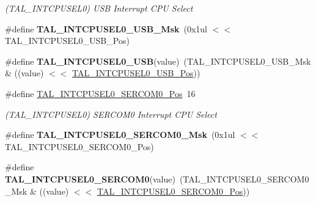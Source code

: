 \begin{DoxyCompactItemize}
\begin{DoxyCompactList}\small\item\em (T\+A\+L\+\_\+\+I\+N\+T\+C\+P\+U\+S\+E\+L0) U\+S\+B Interrupt C\+P\+U Select \end{DoxyCompactList}\item 
\hypertarget{group___s_a_m_l21___t_a_l_gaee7412a6536cc0d4d8210e26a6389551}{}\#define {\bfseries T\+A\+L\+\_\+\+I\+N\+T\+C\+P\+U\+S\+E\+L0\+\_\+\+U\+S\+B\+\_\+\+Msk}~(0x1ul $<$$<$ T\+A\+L\+\_\+\+I\+N\+T\+C\+P\+U\+S\+E\+L0\+\_\+\+U\+S\+B\+\_\+\+Pos)\label{group___s_a_m_l21___t_a_l_gaee7412a6536cc0d4d8210e26a6389551}

\item 
\hypertarget{group___s_a_m_l21___t_a_l_ga4113f78f43ac2598504d36265150b787}{}\#define {\bfseries T\+A\+L\+\_\+\+I\+N\+T\+C\+P\+U\+S\+E\+L0\+\_\+\+U\+S\+B}(value)~(T\+A\+L\+\_\+\+I\+N\+T\+C\+P\+U\+S\+E\+L0\+\_\+\+U\+S\+B\+\_\+\+Msk \& ((value) $<$$<$ \hyperlink{group___s_a_m_l21___t_a_l_gace1b71330fba3864462ab3b7ec5f07cf}{T\+A\+L\+\_\+\+I\+N\+T\+C\+P\+U\+S\+E\+L0\+\_\+\+U\+S\+B\+\_\+\+Pos}))\label{group___s_a_m_l21___t_a_l_ga4113f78f43ac2598504d36265150b787}

\item 
\hypertarget{group___s_a_m_l21___t_a_l_gabda29a01b1f115dc9fe9542650fb8973}{}\#define \hyperlink{group___s_a_m_l21___t_a_l_gabda29a01b1f115dc9fe9542650fb8973}{T\+A\+L\+\_\+\+I\+N\+T\+C\+P\+U\+S\+E\+L0\+\_\+\+S\+E\+R\+C\+O\+M0\+\_\+\+Pos}~16\label{group___s_a_m_l21___t_a_l_gabda29a01b1f115dc9fe9542650fb8973}

\begin{DoxyCompactList}\small\item\em (T\+A\+L\+\_\+\+I\+N\+T\+C\+P\+U\+S\+E\+L0) S\+E\+R\+C\+O\+M0 Interrupt C\+P\+U Select \end{DoxyCompactList}\item 
\hypertarget{group___s_a_m_l21___t_a_l_ga2f46dd362db15e4f443f9c86a2894f43}{}\#define {\bfseries T\+A\+L\+\_\+\+I\+N\+T\+C\+P\+U\+S\+E\+L0\+\_\+\+S\+E\+R\+C\+O\+M0\+\_\+\+Msk}~(0x1ul $<$$<$ T\+A\+L\+\_\+\+I\+N\+T\+C\+P\+U\+S\+E\+L0\+\_\+\+S\+E\+R\+C\+O\+M0\+\_\+\+Pos)\label{group___s_a_m_l21___t_a_l_ga2f46dd362db15e4f443f9c86a2894f43}

\item 
\hypertarget{group___s_a_m_l21___t_a_l_ga6d365d9fbee628f3a60866830421862c}{}\#define {\bfseries T\+A\+L\+\_\+\+I\+N\+T\+C\+P\+U\+S\+E\+L0\+\_\+\+S\+E\+R\+C\+O\+M0}(value)~(T\+A\+L\+\_\+\+I\+N\+T\+C\+P\+U\+S\+E\+L0\+\_\+\+S\+E\+R\+C\+O\+M0\+\_\+\+Msk \& ((value) $<$$<$ \hyperlink{group___s_a_m_l21___t_a_l_gabda29a01b1f115dc9fe9542650fb8973}{T\+A\+L\+\_\+\+I\+N\+T\+C\+P\+U\+S\+E\+L0\+\_\+\+S\+E\+R\+C\+O\+M0\+\_\+\+Pos}))\label{group___s_a_m_l21___t_a_l_ga6d365d9fbee628f3a60866830421862c}


\end{DoxyCompactItemize}
